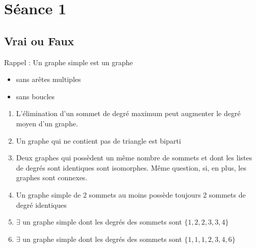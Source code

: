 \section{Séance 1}


\subsection{Vrai ou Faux}
Rappel : Un graphe simple est un graphe
\begin{itemize}
  \item sans arêtes multiples
  \item sans boucles
\end{itemize}
\begin{enumerate}
	\item{L'élimination d'un sommet de degré maximum peut augmenter le degré moyen d'un graphe.}
	\item{Un graphe qui ne contient pas de triangle est biparti}
	\item{Deux graphes qui possèdent un même nombre de sommets et dont les listes de degrés sont identiques sont isomorphes. Même question, si, en plus, les graphes sont connexes.}
	\item{Un graphe simple de 2 sommets au moins possède toujours 2 sommets de degré identiques}
	\item{$\exists$ un graphe simple dont les degrés des sommets sont $\{1,2,2,3,3,4\}$}
	\item{$\exists$ un graphe simple dont les degrés des sommets sont $\{1,1,1,2,3,4,6\}$}	
\end{enumerate}

